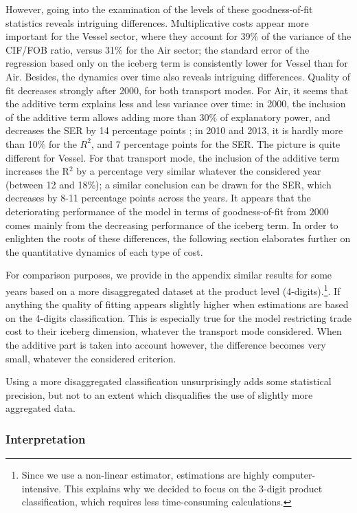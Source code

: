 \documentclass[a4paper,11pt]{article}
\begin{document}
However, going into the examination of the levels of these goodness-of-fit statistics reveals intriguing differences. Multiplicative costs appear more important for the Vessel sector, where they account for 39\% of the variance of the CIF/FOB ratio, versus 31\% for the Air sector; the standard error of the regression based only on the iceberg term is consistently lower for Vessel than for Air. Besides, the dynamics over time also reveals intriguing differences. Quality of fit decreases strongly after 2000, for both transport modes. For Air, it seems that the additive term explains less and less variance over time: in 2000, the inclusion of the additive term allows adding more than 30\% of explanatory power, and decreases the SER by 14 percentage points ;  in 2010 and 2013, it is hardly more than 10\% for the $R^{2}$, and 7 percentage points for the SER. The picture is quite different for Vessel. For that transport mode, the inclusion of the additive term increases the R$^{2}$ by a percentage very similar whatever the considered year (between 12 and 18\%); a similar conclusion can be drawn for the SER, which decreases by 8-11 percentage points across the years. It appears that the deteriorating performance of the model in terms of goodness-of-fit from 2000 comes mainly from the decreasing performance of the iceberg term. In order to enlighten the roots of these differences, the following section elaborates further on the quantitative dynamics of each type of cost.

For comparison purposes, we provide in the appendix similar results for some years based on a more disaggregated dataset at the product level (4-digits).\footnote{Since we use a non-linear estimator, estimations are highly computer-intensive. This explains why we decided to focus on the 3-digit product classification, which requires less time-consuming calculations.}. If anything the quality of fitting appears slightly higher when estimations are based on the 4-digits classification. This is especially true for the model restricting trade cost to their iceberg dimension, whatever the transport mode considered. When the additive part is taken into account however, the difference becomes very small, whatever the considered criterion.

Using a more disaggregated classification unsurprisingly adds some statistical precision, but not to an extent which disqualifies the use of slightly more aggregated data.


\subsubsection{Interpretation}
\end{document}
